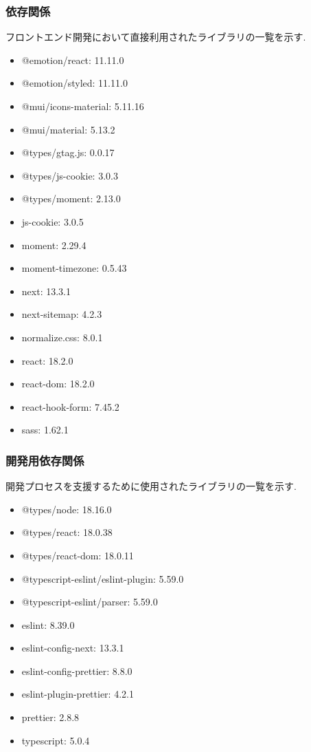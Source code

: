 \documentclass[b5paper,12pt,dvipdfmx]{jsreport}
\begin{document}
\subsubsection{依存関係}
フロントエンド開発において直接利用されたライブラリの一覧を示す.

\begin{itemize}
    \item @emotion/react: 11.11.0
    \item @emotion/styled: 11.11.0
    \item @mui/icons-material: 5.11.16
    \item @mui/material: 5.13.2
    \item @types/gtag.js: 0.0.17
    \item @types/js-cookie: 3.0.3
    \item @types/moment: 2.13.0
    \item js-cookie: 3.0.5
    \item moment: 2.29.4
    \item moment-timezone: 0.5.43
    \item next: 13.3.1
    \item next-sitemap: 4.2.3
    \item normalize.css: 8.0.1
    \item react: 18.2.0
    \item react-dom: 18.2.0
    \item react-hook-form: 7.45.2
    \item sass: 1.62.1
\end{itemize}


\subsubsection{開発用依存関係}
開発プロセスを支援するために使用されたライブラリの一覧を示す.

\begin{itemize}
    \item @types/node: 18.16.0
    \item @types/react: 18.0.38
    \item @types/react-dom: 18.0.11
    \item @typescript-eslint/eslint-plugin: 5.59.0
    \item @typescript-eslint/parser: 5.59.0
    \item eslint: 8.39.0
    \item eslint-config-next: 13.3.1
    \item eslint-config-prettier: 8.8.0
    \item eslint-plugin-prettier: 4.2.1
    \item prettier: 2.8.8
    \item typescript: 5.0.4
\end{itemize}
\end{document}
